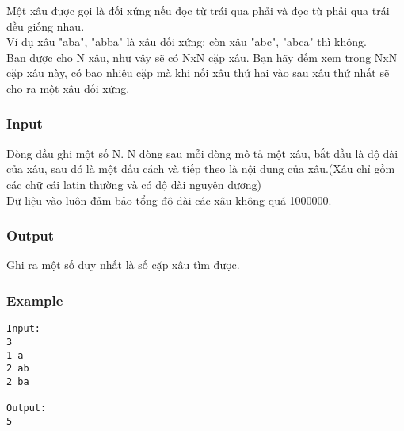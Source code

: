 



   Một xâu được gọi là đối xứng nếu đọc từ trái qua phải và đọc từ phải qua trái đều giống nhau.   
\\   Ví dụ xâu "aba", "abba" là xâu đối xứng; còn xâu "abc", "abca" thì không.   
\\   Bạn được cho N xâu, như vậy sẽ có NxN cặp xâu. Bạn hãy đếm xem trong NxN cặp xâu này, có bao nhiêu cặp mà khi nối xâu thứ hai vào sau xâu thứ nhất sẽ cho ra một xâu đối xứng.  

\subsubsection{   Input  }

   Dòng đầu ghi một số N. N dòng sau mỗi dòng mô tả một xâu, bắt đầu là độ dài của xâu, sau đó là một dấu cách và tiếp theo là nội dung của xâu.(Xâu chỉ gồm các chữ cái latin thường và có độ dài nguyên dương)   
\\   Dữ liệu vào luôn đảm bảo tổng độ dài các xâu không quá 1000000.  

\subsubsection{   Output  }

   Ghi ra một số duy nhất là số cặp xâu tìm được.  

\subsubsection{   Example  }
\begin{verbatim}
Input:
3
1 a
2 ab
2 ba

Output:
5
\end{verbatim}